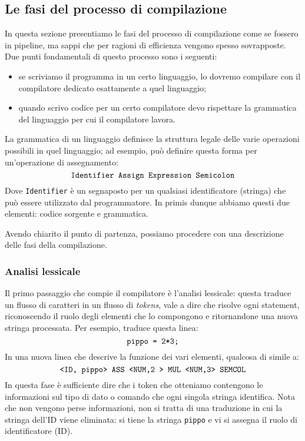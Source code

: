 \documentclass[class=book, crop=false, oneside, 12pt]{standalone}
\begin{document}
\subsection{Le fasi del processo di compilazione}
In questa sezione presentiamo le fasi del processo di compilazione come se fossero in pipeline, ma sappi che per ragioni di efficienza vengono spesso sovrapposte. Due punti fondamentali di questo processo sono i seguenti:
\begin{itemize}
    \item se scriviamo il programma in un certo linguaggio, lo dovremo compilare con il compilatore dedicato esattamente a quel linguaggio;
    \item quando scrivo codice per un certo compilatore devo rispettare la grammatica del linguaggio per cui il compilatore lavora.
\end{itemize}
La grammatica di un linguaggio definisce la struttura legale delle varie operazioni possibili in quel linguaggio; ad esempio, può definire questa forma per un'operazione di assegnamento:
\begin{equation*}
	\textrm{\texttt{Identifier Assign Expression Semicolon}}
\end{equation*}
Dove \texttt{Identifier} è un segnaposto per un qualsiasi identificatore (stringa) che può essere utilizzato dal programmatore.
In primis dunque abbiamo questi due elementi: codice sorgente e grammatica.

Avendo chiarito il punto di partenza, possiamo procedere con una descrizione delle fasi della compilazione.

\subsubsection{Analisi lessicale}
Il primo passaggio che compie il compilatore è l'analisi lessicale: questa traduce un flusso di caratteri in un flusso di \emph{tokens}, vale a dire che risolve ogni statement, riconoscendo il ruolo degli elementi che lo compongono e ritornandone una nuova stringa processata. Per esempio, traduce questa linea:
\begin{equation*}
	\textrm{\texttt{pippo = 2*3;}}
\end{equation*}
In una nuova linea che descrive la funzione dei vari elementi, qualcosa di simile a:
\begin{equation*}
	\textrm{\texttt{<ID, pippo> ASS <NUM,2 > MUL <NUM,3> SEMCOL}}
\end{equation*}
In questa fase è sufficiente dire che i token che otteniamo contengono le informazioni sul tipo di dato o comando che ogni singola stringa identifica. Nota che non vengono perse informazioni, non si tratta di una traduzione in cui la stringa dell'ID viene eliminata: si tiene la stringa \texttt{pippo} e vi si assegna il ruolo di identificatore (ID).
\end{document}
